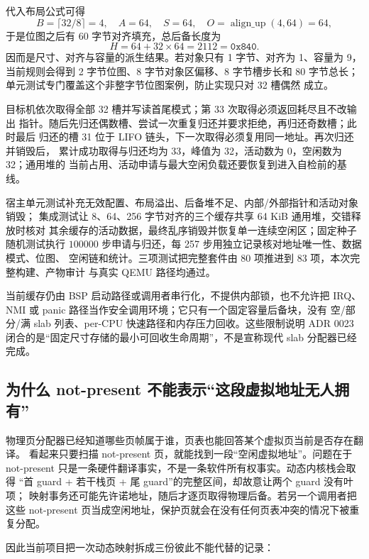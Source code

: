 代入布局公式可得
\[
  B=\lceil32/8\rceil=4,\quad A=64,\quad S=64,\quad
  O=\operatorname{align\_up}(4,64)=64,
\]
于是位图之后有 60 字节对齐填充，总后备长度为
\[
  H=64+32\times64=2112=\mathtt{0x840}.
\]
 因而是尺寸、对齐与容量的派生结果。若对象只有 1 字节、对齐为
1、容量为 9，当前规则会得到 2 字节位图、8 字节对象区偏移、8 字节槽步长和
80 字节总长；单元测试专门覆盖这个非整字节位图案例，防止实现只对 32 槽偶然
成立。

目标机依次取得全部 32 槽并写读首尾模式；第 33 次取得必须返回耗尽且不改输出
指针。随后先归还偶数槽、尝试一次重复归还并要求拒绝，再归还奇数槽；此时最后
归还的槽 31 位于 LIFO 链头，下一次取得必须复用同一地址。再次归还并销毁后，
累计成功取得与归还均为 33，峰值为 32，活动数为 0，空闲数为 32；通用堆的
当前占用、活动申请与最大空闲负载还要恢复到进入自检前的基线。

宿主单元测试补充无效配置、布局溢出、后备堆不足、内部/外部指针和活动对象销毁；
集成测试让 8、64、256 字节对齐的三个缓存共享 64 KiB 通用堆，交错释放时核对
其余缓存的活动数据，最终乱序销毁并恢复单一连续空闲区；固定种子随机测试执行
\(100000\) 步申请与归还，每 257 步用独立记录核对地址唯一性、数据模式、位图、
空闲链和统计。三项测试把完整套件由 80 项推进到 83 项，本次完整构建、产物审计
与真实 QEMU 路径均通过。

当前缓存仍由 BSP 启动路径或调用者串行化，不提供内部锁，也不允许把
IRQ、NMI 或 panic 路径当作安全调用环境；它只有一个固定容量后备块，没有
空/部分/满 slab 列表、per-CPU 快速路径和内存压力回收。这些限制说明 ADR 0023
闭合的是“固定尺寸存储的最小可回收生命周期”，不是宣称现代 slab 分配器已经
完成。

\subsection{为什么 not-present 不能表示“这段虚拟地址无人拥有”}

物理页分配器已经知道哪些页帧属于谁，页表也能回答某个虚拟页当前是否存在翻译。
看起来只要扫描 not-present 页，就能找到一段“空闲虚拟地址”。问题在于
not-present 只是一条硬件翻译事实，不是一条软件所有权事实。动态内核栈会取得
“首 guard + 若干栈页 + 尾 guard”的完整区间，却故意让两个 guard 没有叶项；
映射事务还可能先许诺地址，随后才逐页取得物理后备。若另一个调用者把这些
not-present 页当成空闲地址，保护页就会在没有任何页表冲突的情况下被重复分配。

因此当前项目把一次动态映射拆成三份彼此不能代替的记录：

